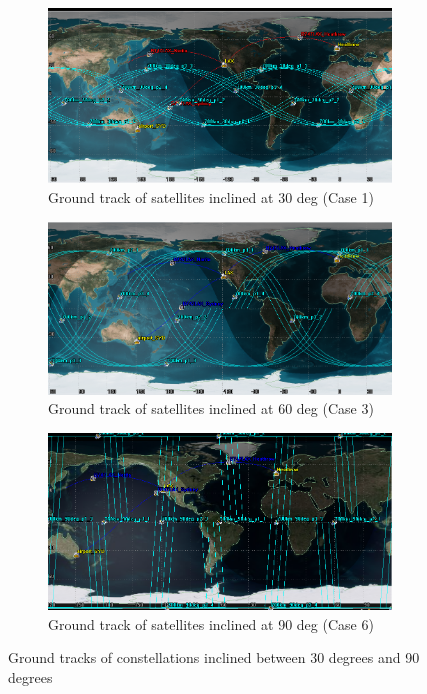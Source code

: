 \begin{figure}[H]
	
	\begin{subfigure}[b]{\textwidth}
	\centering
	\includegraphics[scale = 0.45]{Pictures/12sat_30deg.png}
	
	\caption{Ground track of satellites inclined at 30 deg (Case 1)}
	\label{fig:12sat_30deg}
	\end{subfigure}
	
	\begin{subfigure}[b]{\textwidth}
	\centering
	\includegraphics[scale = 0.45]{Pictures/12sat_60deg.png}
	
	\caption{Ground track of satellites inclined at 60 deg (Case 3)}
	\label{fig:12sat_60deg}
	\end{subfigure}
		
	
	\begin{subfigure}[b]{\textwidth}
	\centering
	\includegraphics[scale = 0.45]{Pictures/12sat_90deg.png}
	
	\caption{Ground track of satellites inclined at 90 deg (Case 6)}
	\label{fig:12sat_90deg}
	\end{subfigure}
	
	\caption{Ground tracks of constellations inclined between 30 degrees and 90 degrees}
\end{figure} 

